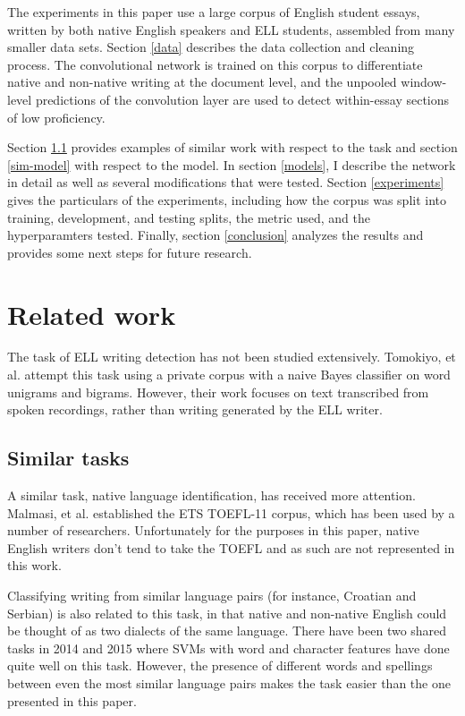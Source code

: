 \documentclass{article} %
\begin{document}
The experiments in this paper use a large corpus of English student essays,
written by both native
English speakers and ELL students, assembled from many smaller
data sets. Section \ref{data} describes the data collection and cleaning process.
The convolutional network is trained on this corpus to differentiate native
and non-native
writing at the document level, and the unpooled window-level predictions of the
convolution layer are used to detect
within-essay sections of low proficiency.

Section \ref{sim-task} provides examples of similar work with respect to the
task and
section \ref{sim-model} with respect to
the model.
In section \ref{models}, I describe the network in detail as well as several
modifications that were tested. Section \ref{experiments} gives the particulars
of the
experiments, including how the corpus was split into training, development, and
testing splits, the
metric used, and the hyperparamters tested. Finally, section \ref{conclusion}
analyzes the
results and provides some next steps for future research.

\section{Related work}

The task of ELL writing detection has not been studied extensively.
Tomokiyo, et al. attempt this task using a private corpus with a naive Bayes
classifier on word unigrams and bigrams.\cite{tomokiyo}
However, their work focuses on text transcribed from spoken recordings,
rather than writing generated by the ELL writer.

\subsection{Similar tasks} \label{sim-task}

A similar task, native language identification, has received more attention.
Malmasi, et al. established the ETS TOEFL-11 corpus, which has been used by a
number of researchers.\cite{malmasi} Unfortunately for the purposes in this
paper, native English writers don't tend to take the TOEFL and as such are not
represented in this work.

Classifying writing from similar language pairs (for instance, Croatian and Serbian)
is also related to this task, in that native and non-native English could be thought
of as two dialects of the same language. There have been
two shared tasks in 2014 and 2015 where SVMs with word and character features have
done quite well on this task.\cite{goutte} However, the presence of different
words and spellings between even the most similar language pairs makes the
task easier than the one presented in this paper.
\end{document}
